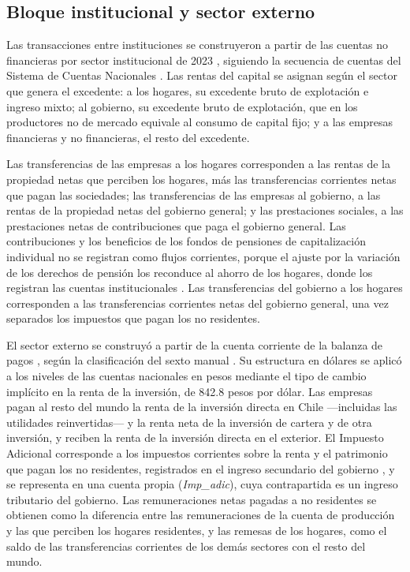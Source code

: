\documentclass[11pt]{article}
\begin{document}
\subsection{Bloque institucional y sector externo}

Las transacciones entre instituciones se construyeron a partir de las cuentas no financieras por sector institucional de 2023 \cite{bcch_cnsi_2023}, siguiendo la secuencia de cuentas del Sistema de Cuentas Nacionales \cite{sna_2008}. Las rentas del capital se asignan según el sector que genera el excedente: a los hogares, su excedente bruto de explotación e ingreso mixto; al gobierno, su excedente bruto de explotación, que en los productores no de mercado equivale al consumo de capital fijo; y a las empresas financieras y no financieras, el resto del excedente.

Las transferencias de las empresas a los hogares corresponden a las rentas de la propiedad netas que perciben los hogares, más las transferencias corrientes netas que pagan las sociedades; las transferencias de las empresas al gobierno, a las rentas de la propiedad netas del gobierno general; y las prestaciones sociales, a las prestaciones netas de contribuciones que paga el gobierno general. Las contribuciones y los beneficios de los fondos de pensiones de capitalización individual no se registran como flujos corrientes, porque el ajuste por la variación de los derechos de pensión los reconduce al ahorro de los hogares, donde los registran las cuentas institucionales \cite[cap.~17]{sna_2008}. Las transferencias del gobierno a los hogares corresponden a las transferencias corrientes netas del gobierno general, una vez separados los impuestos que pagan los no residentes.

El sector externo se construyó a partir de la cuenta corriente de la balanza de pagos \cite{bcch_bdp_2023}, según la clasificación del sexto manual \cite{imf_bpm6_2009}. Su estructura en dólares se aplicó a los niveles de las cuentas nacionales en pesos mediante el tipo de cambio implícito en la renta de la inversión, de 842.8 pesos por dólar. Las empresas pagan al resto del mundo la renta de la inversión directa en Chile ---incluidas las utilidades reinvertidas--- y la renta neta de la inversión de cartera y de otra inversión, y reciben la renta de la inversión directa en el exterior. El Impuesto Adicional corresponde a los impuestos corrientes sobre la renta y el patrimonio que pagan los no residentes, registrados en el ingreso secundario del gobierno \cite[cap.~12]{imf_bpm6_2009}, y se representa en una cuenta propia (\textit{Imp\_adic}), cuya contrapartida es un ingreso tributario del gobierno. Las remuneraciones netas pagadas a no residentes se obtienen como la diferencia entre las remuneraciones de la cuenta de producción y las que perciben los hogares residentes, y las remesas de los hogares, como el saldo de las transferencias corrientes de los demás sectores con el resto del mundo.
\end{document}
